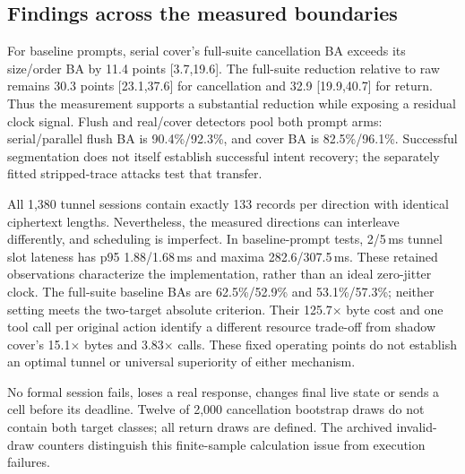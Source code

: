 \subsection{Findings across the measured boundaries}
For baseline prompts, serial cover's full-suite cancellation BA exceeds its size/order BA by 11.4 points [3.7,19.6]. The full-suite reduction relative to raw remains 30.3 points [23.1,37.6] for cancellation and 32.9 [19.9,40.7] for return. Thus the measurement supports a substantial reduction while exposing a residual clock signal. Flush and real/cover detectors pool both prompt arms: serial/parallel flush BA is 90.4\%/92.3\%, and cover BA is 82.5\%/96.1\%. Successful segmentation does not itself establish successful intent recovery; the separately fitted stripped-trace attacks test that transfer.

All 1,380 tunnel sessions contain exactly 133 records per direction with identical ciphertext lengths. Nevertheless, the measured directions can interleave differently, and scheduling is imperfect. In baseline-prompt tests, 2/5\,ms tunnel slot lateness has p95 1.88/1.68\,ms and maxima 282.6/307.5\,ms. These retained observations characterize the implementation, rather than an ideal zero-jitter clock. The full-suite baseline BAs are 62.5\%/52.9\% and 53.1\%/57.3\%; neither setting meets the two-target absolute criterion. Their 125.7$\times$ byte cost and one tool call per original action identify a different resource trade-off from shadow cover's 15.1$\times$ bytes and 3.83$\times$ calls. These fixed operating points do not establish an optimal tunnel or universal superiority of either mechanism.

No formal session fails, loses a real response, changes final live state or sends a cell before its deadline. Twelve of 2,000 cancellation bootstrap draws do not contain both target classes; all return draws are defined. The archived invalid-draw counters distinguish this finite-sample calculation issue from execution failures.


